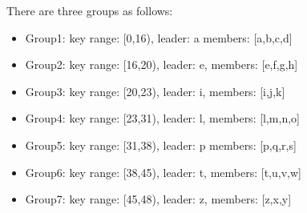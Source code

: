 \documentclass{amsart}
\theoremstyle{definition}
\theoremstyle{remark}
\numberwithin{equation}{section}
\begin{document}
There are three groups as follows:
\begin{itemize}
\item Group1: key range: [0,16), leader: a members: [a,b,c,d]
\item Group2: key range: [16,20), leader: e, members: [e,f,g,h] 
\item Group3: key range: [20,23), leader: i, members: [i,j,k] 
\item Group4: key range: [23,31), leader: l, members: [l,m,n,o]
\item Group5: key range: [31,38), leader: p members: [p,q,r,s]
\item Group6: key range: [38,45), leader: t, members: [t,u,v,w]
\item Group7: key range: [45,48), leader: z, members: [z,x,y]
\end{itemize}
\end{document}
